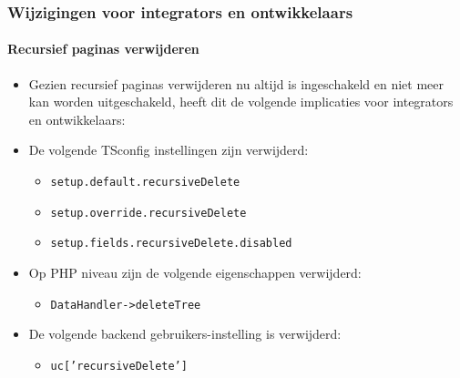 %

\begin{frame}[fragile]
	\frametitle{Wijzigingen voor integrators en ontwikkelaars}
	\framesubtitle{Recursief paginas verwijderen}

	\lstset{basicstyle=\tiny\ttfamily}

	\begin{itemize}
		\item Gezien recursief paginas verwijderen nu altijd is ingeschakeld en niet meer
		    kan worden uitgeschakeld, heeft dit de volgende implicaties voor integrators
		    en ontwikkelaars:
		\item De volgende TSconfig instellingen zijn verwijderd:

			\begin{itemize}
				\item \texttt{setup.default.recursiveDelete}
				\item \texttt{setup.override.recursiveDelete}
				\item \texttt{setup.fields.recursiveDelete.disabled}
			\end{itemize}

		\item Op PHP niveau zijn de volgende eigenschappen verwijderd:

			\begin{itemize}
				\item \texttt{DataHandler->deleteTree}
			\end{itemize}

		\item De volgende backend gebruikers-instelling is verwijderd:

			\begin{itemize}
				\item \texttt{uc['recursiveDelete']}
			\end{itemize}

	\end{itemize}

\end{frame}

